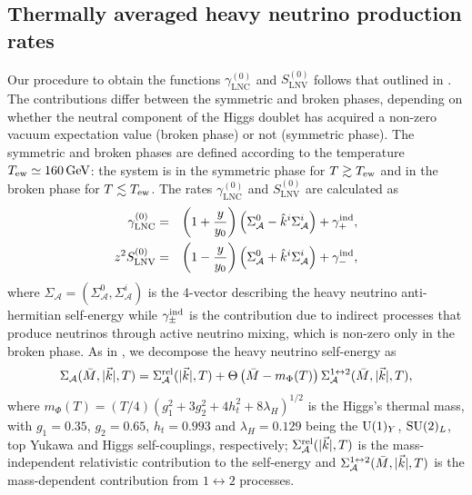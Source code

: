 \documentclass[12pt, a4paper]{article}
\def\Mav{\bar{M}}
\def\LNC{\text{LNC}}
\def\LNV{\text{LNV}}
\begin{document}
\subsection{Thermally averaged heavy neutrino production rates}
Our procedure to obtain the functions $ \gamma_{\LNC}^{(0)}$ and $ S_{\LNV}^{(0)}$ follows that outlined in \cite{Klaric:2021cpi}. The contributions differ between the symmetric and broken phases, depending on whether the neutral component of the Higgs doublet has acquired a non-zero vacuum expectation value (broken phase) or not (symmetric phase). The symmetric and broken phases are defined according to the temperature $T_{\rm ew} \simeq 160\,\text{GeV}$: the system is in the symmetric phase for 
$T\gtrsim T_{\rm ew}$ and in the broken phase for $T\lesssim T_{\rm ew}$. The rates $ \gamma_{\LNC}^{(0)}$ and $ S_{\LNV}^{(0)}$ are calculated as
\begin{eqnarray}\label{eq:G0}
 \gamma_{\LNC}^{(0)} &=& \left(1 + \frac{y}{y_0}\right)\left(\Sigma_\mathcal{A}^0 - \hat{k}^i\Sigma_\mathcal{A}^i \right) + \gamma^{\rm ind}_+, \\
  z^2S_{\LNV}^{(0)} &=& \left(1 - \frac{y}{y_0}\right)\left(\Sigma_\mathcal{A}^0 + \hat{k}^i\Sigma_\mathcal{A}^i\right) + \gamma^{\rm ind}_-,
  \label{eq:S0}
\end{eqnarray}
where $\Sigma_\mathcal{A} = (\Sigma_\mathcal{A}^0, \Sigma_\mathcal{A}^i)$ is the 4-vector describing the heavy neutrino anti-hermitian self-energy while $\gamma^{\rm ind}_\pm$ is the contribution due to indirect processes that produce neutrinos through active neutrino mixing, which is non-zero only in the broken phase. As in \cite{Klaric:2021cpi}, we decompose the heavy neutrino self-energy as
\begin{equation}\label{eq:selfenergytot}
 \Sigma_\mathcal{A}(\Mav, |\vec{k}|, T) = \Sigma_\mathcal{A}^{\rm rel}(|\vec{k}|, T) + \Theta\left(\Mav - m_\Phi(T)\right) \Sigma_\mathcal{A}^{\rm 1\leftrightarrow 2}(\Mav, |\vec{k}|, T),
\end{equation}
where $m_\Phi(T) = (T/4)(g_1^2 + 3g_2^2 + 4h_t^2 + 8\lambda_H)^{1/2}$ is the Higgs's thermal mass, with $g_1 = 0.35$, $g_2 = 0.65$, $h_t = 0.993$ and $\lambda_H = 0.129$ being the ${\rm U}(1)_Y$, ${\rm SU}(2)_L$, top Yukawa and Higgs self-couplings, respectively; $\Sigma_\mathcal{A}^{\rm rel}(|\vec{k}|, T)$ is the mass-independent relativistic contribution to the self-energy and $\Sigma_\mathcal{A}^{\rm 1\leftrightarrow 2}(\Mav, |\vec{k}|, T)$ is the mass-dependent contribution from $1\leftrightarrow 2$ processes. 
\end{document}

